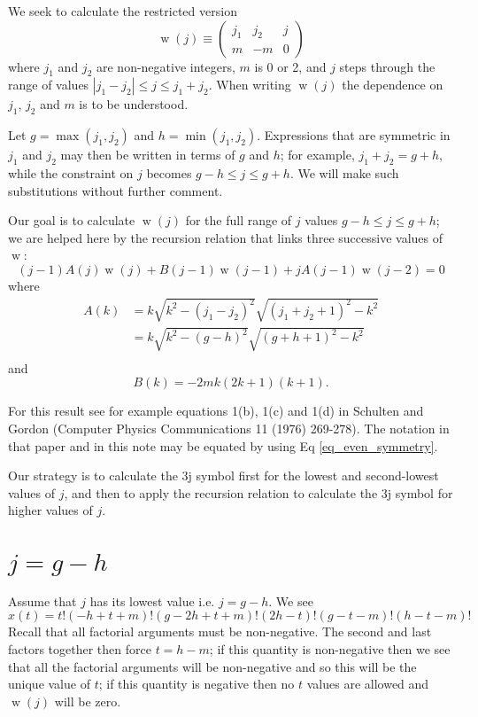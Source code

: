 \documentclass[11pt]{article}
\newcommand{\symthreejarray}[6]{{\left( \begin{array}{ccc} #1 & #2 & #3 \\ #4 & #5 & #6 \end{array} \right)} }
\DeclareMathOperator{\threej}{w}
\begin{document}
We seek to calculate the restricted version 
\begin{equation}
\threej(j) \equiv \symthreejarray{j_1}{j_2}{j}{m}{-m}{0}
\end{equation}
where $j_1$ and $j_2$ are non-negative integers, $m$ is 0 or 2, and $j$ steps through the range of values $|j_1 - j_2| \le j \le j_1 + j_2$. When writing $\threej(j)$ the dependence on $j_1$, $j_2$ and $m$ is to be understood.

Let $g = \max(j_1, j_2)$ and $h = \min(j_1, j_2)$. Expressions that are symmetric in $j_1$ and $j_2$ may then be written in terms of $g$ and $h$; for example, $j_1 + j_2 = g + h$, while the constraint on $j$ becomes $g-h \le j \le g+h$. We will make such substitutions without further comment.

Our goal is to calculate $\threej(j)$ for the full range of $j$ values $g-h \le j \le g+h$; we are helped here by the recursion relation that links three successive values of $\threej$:
\begin{equation}
(j-1) A(j)\threej(j) + B(j-1)\threej(j-1) + jA(j-1)\threej(j-2) = 0
\end{equation}
where
\begin{equation}
\begin{split}
A(k) &= k \sqrt{k^2 - (j_1-j_2)^2} \sqrt{(j_1+j_2+1)^2 - k^2} \\
&= k \sqrt{k^2 - (g-h)^2} \sqrt{(g+h+1)^2 - k^2} \\
\end{split}
\end{equation}
and
\begin{equation}
B(k) = -2mk(2k+1)(k+1).
\end{equation}

\noindent For this result see for example equations 1(b), 1(c) and 1(d) in Schulten and Gordon (Computer Physics Communications 11 (1976) 269-278). The notation in that paper and in this note may be equated by using Eq \ref{eq_even_symmetry}.

Our strategy is to calculate the 3j symbol first for the lowest and second-lowest values of $j$, and then to apply the recursion relation to calculate the 3j symbol for higher values of $j$.

\section{$j = g-h$}

Assume that $j$ has its lowest value i.e. $j = g-h$. We see
\begin{equation}
x(t) = t! (-h+t+m)! (g-2h+t+m)! (2h-t)! (g-t-m)! (h-t-m)!
\end{equation}
Recall that all factorial arguments must be non-negative. The second and last factors together then force $t=h-m$; if this quantity is non-negative then we see that all the factorial arguments will be non-negative and so this will be the unique value of $t$; if this quantity is negative then no $t$ values are allowed and $\threej(j)$ will be zero.
\end{document}
